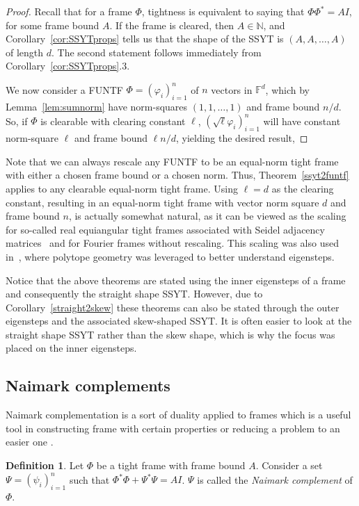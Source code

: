 \documentclass[10pt]{article}
\theoremstyle{plain}
\theoremstyle{definition}
\newtheorem{definition}[thm]{Definition}
\newcommand{\gram}{\Phi^\ast\Phi}
\newcommand{\bF}{\mathbb{F}}
\newcommand{\bN}{\mathbb{N}}
\begin{document}
\begin{proof}
  Recall that for a frame $\Phi$, tightness is equivalent to saying that $\Phi\Phi^\ast = A I$, for some frame bound $A$.  If the frame is cleared, then $A \in \bN$, and Corollary~\ref{cor:SSYTprops} tells us that the shape of the SSYT is $(A,A,\dots, A)$ of length $d$.  The second statement follows immediately from Corollary~\ref{cor:SSYTprops}.3.

We now consider a FUNTF $\Phi=(\varphi_i)_{i=1}^n$ of $n$ vectors in $\bF^d$, which by Lemma~\ref{lem:sumnorm} have norm-squares $(1,1,\dots,1)$ and frame bound $n/d$. So, if $\Phi$ is clearable with clearing constant $\ell$, $(\sqrt{\ell}\varphi_i)_{i=1}^n$ will have constant norm-square $\ell$ and frame bound $\ell n/d$, yielding the desired result,
\end{proof}

Note that we can always rescale any FUNTF to be an equal-norm tight frame with either a chosen frame bound or a chosen norm.  Thus, Theorem~\ref{ssyt2funtf} applies to any clearable equal-norm tight frame. Using $\ell =d$ as the clearing constant, resulting in an equal-norm tight frame with vector norm square $d$ and frame bound $n$, is actually somewhat natural, as it can be viewed as the scaling for so-called real equiangular tight frames associated with Seidel adjacency matrices~\cite{VaSei66} and for Fourier frames without rescaling. This scaling was also used in~\cite{HPpolytope}, where polytope geometry was leveraged to better understand eigensteps.

Notice that the above theorems are stated using the inner eigensteps of a frame and consequently the straight shape SSYT. However, due to Corollary~\ref{straight2skew} these theorems can also be stated through the outer eigensteps and the associated skew-shaped SSYT. It is often easier to look at the straight shape SSYT rather than the skew shape, which is why the focus was placed on the inner eigensteps.

\subsection{Naimark complements}\label{naimarkcomplements}

Naimark complementation is a sort of duality applied to frames which is a useful tool in constructing frame with certain properties or reducing a problem to an easier one  \cite{holmes2004optimal,casazza2013kadison,CFMfusion}.

\begin{definition}\label{defn:naimarktight}
Let $\Phi$ be a tight frame with frame bound $A$. Consider a set $\Psi = ( \psi_i)^{n}_{i=1}$ such that $\gram+\Psi^\ast\Psi = AI$. $\Psi$ is called the \emph{Naimark complement} of $\Phi$.
\end{definition}
\end{document}
